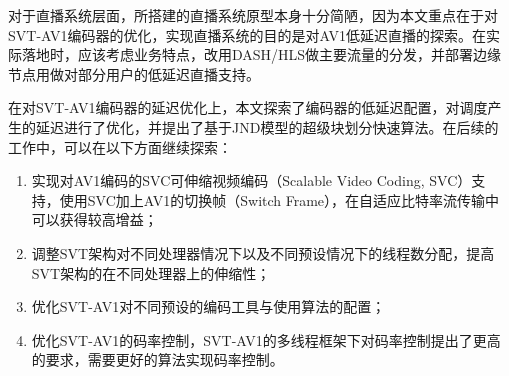 \begin{summary}
	对于直播系统层面，所搭建的直播系统原型本身十分简陋，因为本文重点在于对SVT-AV1编码器的优化，实现直播系统的目的是对AV1低延迟直播的探索。在实际落地时，应该考虑业务特点，改用DASH/HLS做主要流量的分发，并部署边缘节点用做对部分用户的低延迟直播支持。

	在对SVT-AV1编码器的延迟优化上，本文探索了编码器的低延迟配置，对调度产生的延迟进行了优化，并提出了基于JND模型的超级块划分快速算法。在后续的工作中，可以在以下方面继续探索：
	\begin{enumerate}
		\item 实现对AV1编码的SVC可伸缩视频编码（Scalable Video Coding, SVC）支持，使用SVC加上AV1的切换帧（Switch Frame），在自适应比特率流传输中可以获得较高增益；
		\item 调整SVT架构对不同处理器情况下以及不同预设情况下的线程数分配，提高SVT架构的在不同处理器上的伸缩性；
		\item 优化SVT-AV1对不同预设的编码工具与使用算法的配置；
		\item 优化SVT-AV1的码率控制，SVT-AV1的多线程框架下对码率控制提出了更高的要求，需要更好的算法实现码率控制。
	\end{enumerate}
\end{summary}
